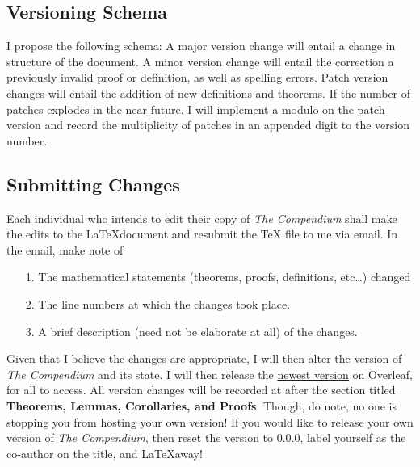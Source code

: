 \documentclass[11pt]{book}
\newcounter{theorem}
\newcounter{definition}
\begin{document}
\subsection*{Versioning Schema}
I propose the following schema: A major version change will entail a change in structure of the document. A minor version change will entail the correction a previously
invalid proof or definition, as well as spelling errors. Patch version changes will entail the addition of new definitions and theorems. If the number of patches explodes
in the near future, I will implement a modulo on the patch version and record the multiplicity of patches in an appended digit to the version number.

\subsection*{Submitting Changes}
Each individual who intends to edit their copy of \emph{The Compendium} shall make the edits to the \LaTeX document and resubmit the TeX file to me via email. In the 
email, make note of 
	\begin{center}
		\begin{enumerate}
			\item[1.] The mathematical statements (theorems, proofs, definitions, etc\dots) changed\\
			\item[2.] The line numbers at which the changes took place.\\
			\item[3.] A brief description (need not be elaborate at all) of the changes.
		\end{enumerate}
	\end{center}
	Given that I believe the changes are appropriate, I will then alter the version of \emph{The Compendium} and its state. I will then release the \href{https://www.overleaf.com/read/gyqrjdfnjyvb}{newest version} on 
	Overleaf, for all to access. All version changes will be recorded at after the section titled \textbf{Theorems, Lemmas, Corollaries, and Proofs}. Though, do note,
	no one is stopping you from hosting your own version! If you would like to release your own version of \emph{The Compendium}, then reset the version to $0.0.0$,
	label yourself as the co-author on the title, and \LaTeX away!

\newpage
\tableofcontents
\newpage
{}
\end{document}
